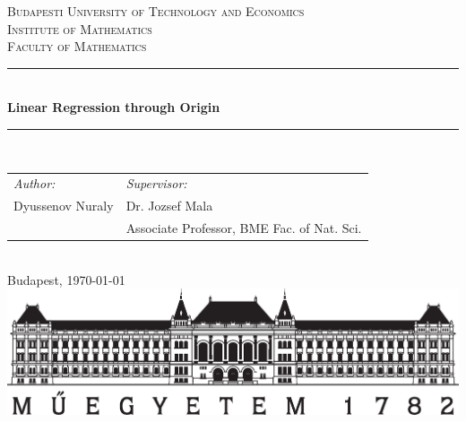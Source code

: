 \documentclass[12pt,a4paper,oneside]{book} %
\newcommand\HRule{\rule{\textwidth}{1pt}}
\begin{document}
\begin{titlepage}
	
	
	\center %
	
	
	\textsc{\LARGE Budapesti University of Technology and Economics}\\[1.5cm] %
	\textsc{\Large Institute of Mathematics}\\[0.5cm] %
	\textsc{\large Faculty of Mathematics}\\[0.5cm] %
	
	
	\HRule \\[0.4cm]
	{ \Large \bfseries Linear Regression through Origin
		 }\\[0.4cm]
	\HRule \\[1.5cm]
	
	
	\begin{tabular}{L{6cm} R{8cm}}
	\emph{Author:}   & \emph{Supervisor:} \\
	Dyussenov Nuraly & Dr. Jozsef Mala   \\
	                 & Associate Professor, BME Fac. of Nat. Sci. 
	\end{tabular}\\[1.3cm]

	
	\vfill
	{\Large Budapest, \today}\\[1.2cm] %
		
	\includegraphics[trim={0cm 0cm 0cm 0cm},clip,width=0.5\linewidth]{bme_logo_nagy.eps}
	
	
\end{titlepage}
\end{document}
